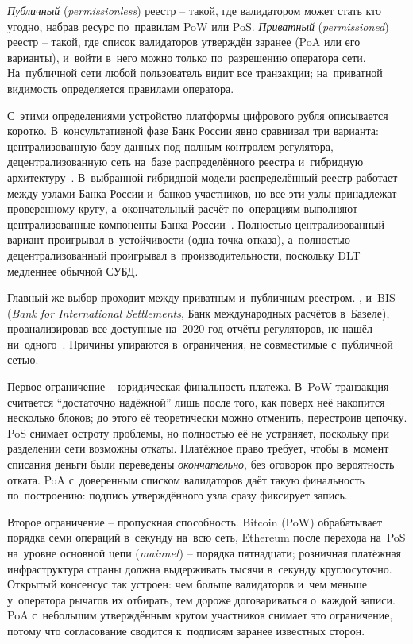 \emph{Публичный} (\textit{permissionless}) реестр -- такой, где
валидатором может стать кто угодно, набрав ресурс по~правилам
PoW или PoS. \emph{Приватный}
(\textit{permissioned}) реестр -- такой, где список валидаторов
утверждён заранее (PoA или его варианты), и~войти в~него можно только
по~разрешению оператора сети. На~публичной сети любой пользователь
видит все транзакции; на~приватной видимость определяется правилами
оператора.

С~этими определениями устройство платформы цифрового рубля
описывается коротко. В~консультативной фазе Банк России явно
сравнивал три варианта: централизованную базу данных под полным
контролем регулятора, децентрализованную сеть на~базе распределённого
реестра и~гибридную архитектуру~\cite{cbr-concept-2021}. В~выбранной
гибридной модели распределённый реестр работает между узлами Банка
России и~банков-участников, но все эти узлы принадлежат
проверенному кругу, а~окончательный расчёт по~операциям выполняют
централизованные компоненты Банка России~\cite{cbr-concept-2021}.
Полностью централизованный вариант проигрывал в~устойчивости (одна
точка отказа), а~полностью децентрализованный проигрывал
в~производительности, поскольку DLT медленнее обычной СУБД.

Главный же выбор проходит между приватным и~публичным реестром.
, и~BIS (\textit{Bank for International
Settlements}, Банк международных расчётов в~Базеле),
проанализировав все доступные на~2020 год
отчёты регуляторов, не нашёл ни~одного~\cite{bis-wp880-cbdc-architectures}.
Причины упираются в~ограничения, не совместимые с~публичной сетью.

Первое ограничение -- юридическая финальность платежа. В~PoW транзакция
считается \enquote{достаточно надёжной} лишь после того, как поверх
неё накопится несколько блоков; до этого её теоретически можно
отменить, перестроив цепочку. PoS снимает остроту проблемы, но
полностью её не устраняет, поскольку при разделении сети возможны
откаты. Платёжное право требует, чтобы в~момент списания
деньги были переведены \emph{окончательно}, без оговорок
про вероятность отката. PoA с~доверенным списком валидаторов даёт
такую финальность по~построению: подпись утверждённого узла
сразу фиксирует запись.

Второе ограничение -- пропускная способность. Bitcoin (PoW)
обрабатывает порядка семи операций в~секунду на~всю сеть, Ethereum
после перехода на~PoS на~уровне основной цепи (\textit{mainnet}) --
порядка пятнадцати; розничная платёжная инфраструктура страны должна
выдерживать тысячи в~секунду круглосуточно. Открытый консенсус так
устроен: чем больше валидаторов и~чем меньше у~оператора рычагов
их отбирать, тем дороже договариваться о~каждой записи. PoA с~небольшим утверждённым кругом
участников снимает это ограничение, потому что согласование сводится
к~подписям заранее известных сторон.


